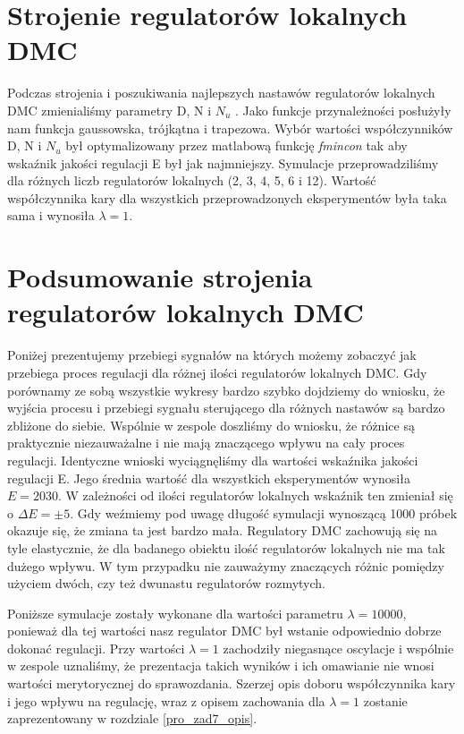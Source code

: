 \section{Strojenie regulatorów lokalnych DMC}
Podczas strojenia i poszukiwania najlepszych nastawów regulatorów lokalnych DMC zmienialiśmy parametry D, N i $N_{u}$ . Jako funkcje przynależności posłużyły nam funkcja gaussowska, trójkątna i trapezowa. Wybór wartości współczynników D, N i $N_{u}$ był optymalizowany przez matlabową funkcję \textit{fmincon} tak aby wskaźnik jakości regulacji E był jak najmniejszy. Symulacje przeprowadziliśmy dla różnych liczb regulatorów lokalnych (2, 3, 4, 5, 6 i 12). Wartość współczynnika kary dla wszystkich przeprowadzonych eksperymentów była taka sama i wynosiła $\lambda = 1$.

\section{Podsumowanie strojenia regulatorów lokalnych DMC}
Poniżej prezentujemy przebiegi sygnałów na których możemy zobaczyć jak przebiega proces regulacji dla różnej ilości regulatorów lokalnych DMC. Gdy porównamy ze sobą wszystkie wykresy bardzo szybko dojdziemy do wniosku, że wyjścia procesu i przebiegi sygnału sterującego dla różnych nastawów są bardzo zbliżone do siebie. Wspólnie w zespole doszliśmy do wniosku, że różnice są praktycznie niezauważalne i nie mają znaczącego wpływu na cały proces regulacji. Identyczne wnioski wyciągnęliśmy dla wartości wskaźnika jakości regulacji E. Jego średnia wartość dla wszystkich eksperymentów wynosiła $E = 2030$. W zależności od ilości regulatorów lokalnych wskaźnik ten zmieniał się o $\Delta E = \pm 5$. Gdy weźmiemy pod uwagę długość symulacji wynoszącą 1000 próbek okazuje się, że zmiana ta jest bardzo mała. Regulatory DMC zachowują się na tyle elastycznie, że dla badanego obiektu ilość regulatorów lokalnych nie ma tak dużego wpływu. W tym przypadku nie zauważymy znaczących różnic pomiędzy użyciem dwóch, czy też dwunastu regulatorów rozmytych. 

Poniższe symulacje zostały wykonane dla wartości parametru $\lambda = 10000$, ponieważ dla tej wartości nasz regulator DMC był wstanie odpowiednio dobrze dokonać regulacji. Przy wartości $\lambda = 1$ zachodziły niegasnące oscylacje i wspólnie w zespole uznaliśmy, że prezentacja takich wyników i ich omawianie nie wnosi wartości merytorycznej do sprawozdania. Szerzej opis doboru współczynnika kary i jego wpływu na regulację, wraz z opisem zachowania dla $\lambda = 1$ zostanie zaprezentowany w rozdziale \ref{pro_zad7_opis}. 
